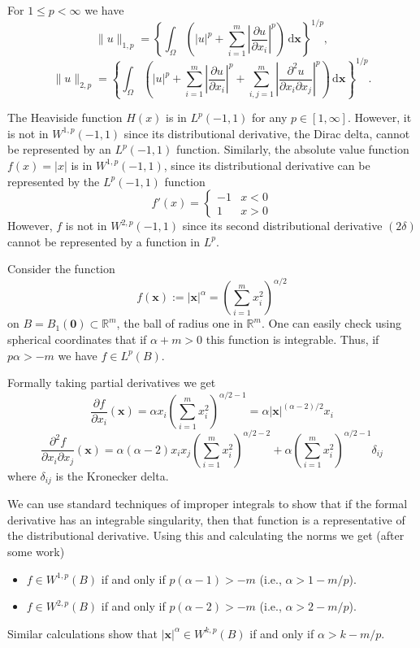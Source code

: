 \begin{Example}
\label{ex:sobolev-first-second-norms}
For $1\leq p<\infty$ we have\[
\|u\|_{1,p}=\left\{\int_{\Omega}\left(|u|^p+\sum_{i=1}^m\left|\dfrac{\partial u}{\partial x_i}\right|^p\right)\,\mathrm{d}\bm{x}\right\}^{1/p},
\]
\[
\|u\|_{2,p}=\left\{\int_{\Omega}\left(|u|^p+\sum_{i=1}^m\left|\dfrac{\partial u}{\partial x_i}\right|^p+\sum_{i,j=1}^m\left|\dfrac{\partial^2u}{\partial x_i\partial x_j}\right|^p\right)\,\mathrm{d}\bm{x}\right\}^{1/p}.
\]
\end{Example}

\begin{Example}
\label{ex:heaviside-absolute-value-sobolev-membership}
The Heaviside function $H(x)$ is in $L^p(-1,1)$ for any $p\in[1,\infty]$. However, it is not in $W^{1,p}(-1,1)$ since its distributional derivative, the Dirac delta, cannot be represented by an $L^p(-1,1)$ function. Similarly, the absolute value function $f(x)=|x|$ is in $W^{1,p}(-1,1)$, since its distributional derivative can be represented by the $L^p(-1,1)$ function\[f'(x)=\begin{cases}-1&x<0\\1&x>0\end{cases}\]However, $f$ is not in $W^{2,p}(-1,1)$ since its second distributional derivative $(2\delta)$ cannot be represented by a function in $L^p$.
\end{Example}

\begin{Example}
\label{ex:radial-power-sobolev-membership}
Consider the function\[f(\bm{x}):=|\bm{x}|^{\alpha}=\left(\sum_{i=1}^m x_i^2\right)^{\alpha/2}\]on $B=B_1(\bm{0})\subset\mathbb{R}^m$, the ball of radius one in $\mathbb{R}^m$. One can easily check using spherical coordinates that if $\alpha+m>0$ this function is integrable. Thus, if $p\alpha>-m$ we have $f\in L^p(B)$.

Formally taking partial derivatives we get\[\dfrac{\partial f}{\partial x_i}(\bm{x})=\alpha x_i\left(\sum_{i=1}^m x_i^2\right)^{\alpha/2-1}=\alpha|\bm{x}|^{(\alpha-2)/2}x_i\]\[
\dfrac{\partial^2f}{\partial x_i\partial x_j}(\bm{x})=\alpha(\alpha-2)x_ix_j\left(\sum_{i=1}^m x_i^2\right)^{\alpha/2-2}+\alpha\left(\sum_{i=1}^m x_i^2\right)^{\alpha/2-1}\delta_{ij}
\]where $\delta_{ij}$ is the Kronecker delta.

We can use standard techniques of improper integrals to show that if the formal derivative has an integrable singularity, then that function is a representative of the distributional derivative. Using this and calculating the norms we get (after some work)\begin{itemize}
\item $f\in W^{1,p}(B)$ if and only if $p(\alpha-1)>-m$ (i.e., $\alpha>1-m/p$).
\item $f\in W^{2,p}(B)$ if and only if $p(\alpha-2)>-m$ (i.e., $\alpha>2-m/p$).
\end{itemize}Similar calculations show that $|\bm{x}|^{\alpha}\in W^{k,p}(B)$ if and only if $\alpha>k-m/p$.
\end{Example}
